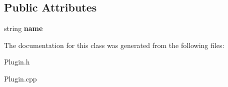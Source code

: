 \subsection*{Public Attributes}
\begin{DoxyCompactItemize}
\item 
\mbox{\label{classPlugin_ab562544338cd35effdff475f1d019bb2}} 
string {\bfseries name}
\end{DoxyCompactItemize}


The documentation for this class was generated from the following files\+:\begin{DoxyCompactItemize}
\item 
Plugin.\+h\item 
Plugin.\+cpp\end{DoxyCompactItemize}
